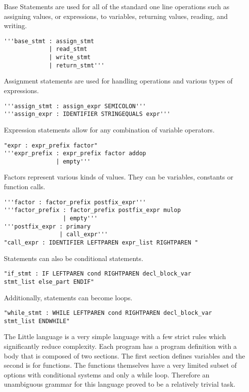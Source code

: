 \documentclass[12pt]{article}
\begin{document}
           Base Statements are used for all of the standard one line operations such as assigning values, or expressions, to variables, returning values, reading, and writing.
           \begin{verbatim}
'''base_stmt : assign_stmt
             | read_stmt
             | write_stmt
             | return_stmt'''
           \end{verbatim}
           
           Assignment statements are used for handling operations and various types of expressions.
           
           \begin{verbatim}
'''assign_stmt : assign_expr SEMICOLON'''
'''assign_expr : IDENTIFIER STRINGEQUALS expr'''
            \end{verbatim}		
           
			Expression statements allow for any combination of variable operators.  
			
			\begin{verbatim}
"expr : expr_prefix factor"      
'''expr_prefix : expr_prefix factor addop
               | empty'''
			\end{verbatim}	   
			
			Factors represent various kinds of values.  They can be variables, constants or function calls.
			
			\begin{verbatim}
'''factor : factor_prefix postfix_expr'''
'''factor_prefix : factor_prefix postfix_expr mulop
                 | empty'''
'''postfix_expr : primary
                | call_expr'''  
"call_expr : IDENTIFIER LEFTPAREN expr_list RIGHTPAREN "                                          
\end{verbatim}	
			
			Statements can also be conditional statements.
			\begin{verbatim}
"if_stmt : IF LEFTPAREN cond RIGHTPAREN decl_block_var
stmt_list else_part ENDIF"
           \end{verbatim}	
           
           Additionally, statements can become loops.
           \begin{verbatim}
"while_stmt : WHILE LEFTPAREN cond RIGHTPAREN decl_block_var
stmt_list ENDWHILE"
           \end{verbatim}
           
    		
    		The Little language is a very simple language with a few strict rules which significantly reduce complexity.  Each program has a program definition with a body that is composed of two sections.  The first section defines variables and the second is for functions.  The functions themselves have a very limited subset of options with conditional systems and only a while loop.  Therefore an unambiguous grammar for this language proved to be a relatively trivial task.  
    		
\end{document}
